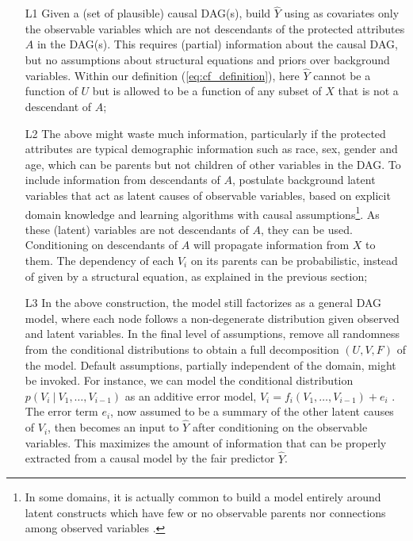 \begin{itemize}
\item[L1] Given a (set of plausible) causal DAG(s), build $\hat Y$
  using as covariates only the observable variables which are not
  descendants of the protected attributes $A$ in the DAG(s). This
  requires (partial) information about the causal DAG, but no
  assumptions about structural equations and priors over background
  variables. Within our definition (\ref{eq:cf_definition}), here
  $\hat Y$ cannot be a function of $U$ but is allowed to be a function
  of any subset of $X$ that is not a descendant of $A$;
\item[L2] The above might waste much information, particularly if the
  protected attributes are typical demographic information such as
  race, sex, gender and age, which can be parents but not children of
  other variables in the DAG. To include information from descendants
  of $A$, postulate background latent variables that act as latent
  causes of observable variables, based on explicit domain knowledge
  and learning algorithms with causal assumptions\footnote{In some
    domains, it is actually common to build a model entirely around
    latent constructs which have few or no observable parents nor
    connections among observed variables \citep{bol:89}.}.  As these
  (latent) variables are not descendants of $A$, they can be used.
  Conditioning on descendants of $A$ will propagate information from
  $X$ to them. The dependency of each $V_i$ on its parents can be
  probabilistic, instead of given by a structural equation, as
  explained in the previous section;
\item[L3] In the above construction, the model still factorizes as a
  general DAG model, where each node follows a non-degenerate
  distribution given observed and latent variables. In the final level
  of assumptions, remove all randomness from the conditional
  distributions to obtain a full decomposition $(U, V, F)$ of the
  model. Default assumptions, partially independent of the domain,
  might be invoked. For instance, we can model the conditional
  distribution $p(V_i\ |\ V_1, \dots, V_{i - 1})$ as an additive error
  model, $V_i = f_i(V_1, \dots, V_{i - 1}) + e_i$ \citep{peters:14}. The error
  term $e_i$, now assumed to be a summary of the other latent causes
  of $V_i$, then becomes an input to $\hat Y$ after conditioning on
  the observable variables. This maximizes the amount of information
  that can be properly extracted from a causal model by the fair
  predictor $\hat Y$.
\end{itemize}


